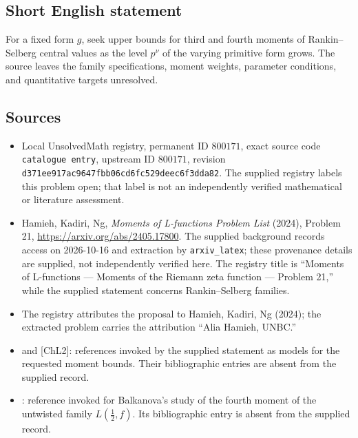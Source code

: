 \documentclass[11pt]{article}
\begin{document}
\subsection{Short English statement}
For a fixed form \(g\), seek upper bounds for third and fourth moments of Rankin--Selberg central values as the level \(p^\nu\) of the varying primitive form grows. The source leaves the family specifications, moment weights, parameter conditions, and quantitative targets unresolved.
\subsection{Sources}
\begin{itemize}
\item Local UnsolvedMath registry, permanent ID \(800171\), exact source code \texttt{catalogue entry}, upstream ID \(800171\), revision \texttt{d371ee917ac9647fbb06cd6fc529deec6f3dda82}. The supplied registry labels this problem open; that label is not an independently verified mathematical or literature assessment.
\item Hamieh, Kadiri, Ng, \emph{Moments of L-functions Problem List} (2024), Problem 21, \url{https://arxiv.org/abs/2405.17800}. The supplied background records access on 2026-10-16 and extraction by \texttt{arxiv\_latex}; these provenance details are supplied, not independently verified here. The registry title is ``Moments of L-functions --- Moments of the Riemann zeta function --- Problem 21,'' while the supplied statement concerns Rankin--Selberg families.
\item The registry attributes the proposal to Hamieh, Kadiri, Ng (2024); the extracted problem carries the attribution ``Alia Hamieh, UNBC.''
\item [ChL1] and [ChL2]: references invoked by the supplied statement as models for the requested moment bounds. Their bibliographic entries are absent from the supplied record.
\item [balkanova]: reference invoked for Balkanova's study of the fourth moment of the untwisted family \(L(\tfrac12,f)\). Its bibliographic entry is absent from the supplied record.
\end{itemize}
\end{document}
